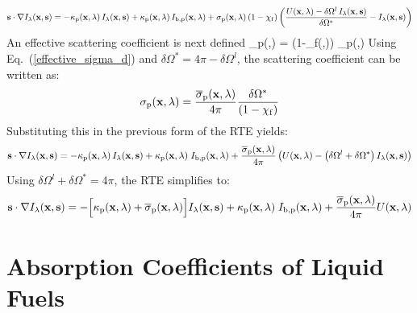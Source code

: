 \begin{equation}
\mathbf{s} \cdot \nabla I_{\lambda}(\mathbf{x},\mathbf{s}) = -\kappa_{\rm p}(\mathbf{x},\lambda) \,
I_{\lambda}(\mathbf{x},\mathbf{s}) + \kappa_{\rm p}(\mathbf{x},\lambda) \, I_{{\rm b,p}}(\mathbf{x},\lambda) +
\sigma_{\rm p}(\mathbf{x},\lambda) \left( 1-\chi_{\rm f} \right) \left( \frac{U(\mathbf{x},\lambda) - \delta\Omega^l \, I_{\lambda}(\mathbf{x},\mathbf{s})}{\delta\Omega^*} - I_{\lambda}(\mathbf{x},\mathbf{s}) \right)
\end{equation}
An effective scattering coefficient is next defined
\be
\label{effective_sigma_d}
\overline{\sigma}_{\rm p}(\bx,\la) =  \Big(1-\chi_{\rm f}(\bx,\la)\Big) \; \sigma_{\rm p}(\bx,\la)
\ee
Using Eq.~(\ref{effective_sigma_d}) and $\delta\Omega^*=4\pi - \delta\Omega^l$, the scattering coefficient can be written as:
\begin{equation}
\sigma_{\rm p}(\mathbf{x},\lambda) = \frac{\overline{\sigma}_{\rm p}(\mathbf{x},\lambda)}{4\pi} \frac{\delta\Omega^*}{\left(1-\chi_{\rm f} \right)}
\end{equation}
Substituting this in the previous form of the RTE yields:
\begin{equation}
\mathbf{s} \cdot \nabla I_{\lambda}(\mathbf{x},\mathbf{s}) = -\kappa_{\rm p}(\mathbf{x},\lambda) \,
I_{\lambda}(\mathbf{x},\mathbf{s}) +\kappa_{\rm p}(\mathbf{x},\lambda) \; I_{{\rm b,p}}(\mathbf{x},\lambda) +
\frac{\overline{\sigma}_{\rm p}(\mathbf{x},\lambda)}{4\pi} \left( U(\mathbf{x},\lambda) - \left( \delta \Omega^l
+ \delta\Omega^* \right) I_{\lambda}(\mathbf{x},\mathbf{s}) \right)
\end{equation}
Using $\delta\Omega^l+ \delta\Omega^*=4\pi $, the RTE simplifies to:
\begin{equation}
\mathbf{s} \cdot \nabla I_{\lambda}(\mathbf{x},\mathbf{s}) = -\Big[\kappa_{\rm p}(\mathbf{x},\lambda) + \overline{\sigma}_{\rm p}(\mathbf{x},\lambda)\Big]
I_{\lambda}(\mathbf{x},\mathbf{s}) +\kappa_{\rm p}(\mathbf{x},\lambda) \; I_{{\rm b,p}}(\mathbf{x},\lambda) +
\frac{\overline{\sigma}_{\rm p}(\mathbf{x},\lambda)}{4\pi} U(\mathbf{x},\lambda)
\end{equation}




\chapter{Absorption Coefficients of Liquid Fuels}
\label{app_abscoeff}

